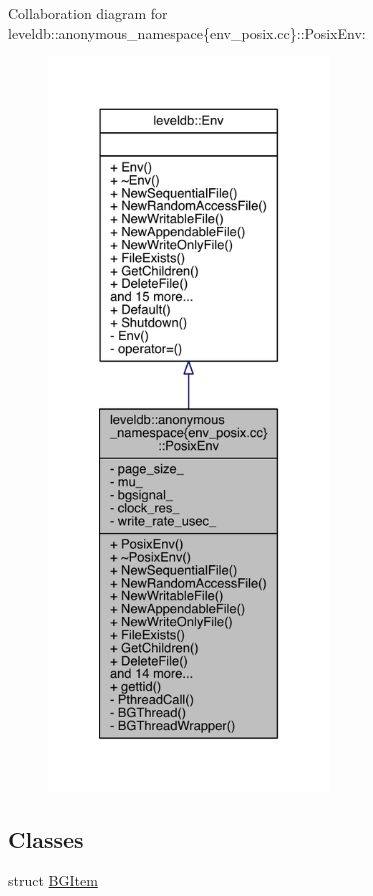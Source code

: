 Collaboration diagram for leveldb\+:\+:anonymous\+\_\+namespace\{env\+\_\+posix.\+cc\}\+:\+:Posix\+Env\+:
\nopagebreak
\begin{figure}[H]
\begin{center}
\leavevmode
\includegraphics[height=550pt]{classleveldb_1_1anonymous__namespace_02env__posix_8cc_03_1_1_posix_env__coll__graph}
\end{center}
\end{figure}
\subsection*{Classes}
\begin{DoxyCompactItemize}
\item 
struct \hyperlink{structleveldb_1_1anonymous__namespace_02env__posix_8cc_03_1_1_posix_env_1_1_b_g_item}{B\+G\+Item}
\end{DoxyCompactItemize}
